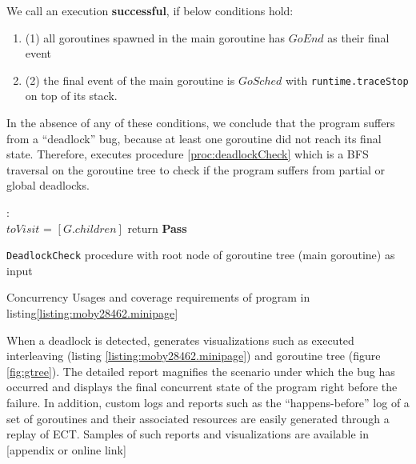 We call an execution \textbf{successful}, if below conditions hold:
\begin{enumerate}
  \item (1) all goroutines spawned in the main goroutine has $GoEnd$ as their final event
  \item (2) the final event of the main goroutine is $GoSched$ with \texttt{runtime.traceStop} on top of its stack.
\end{enumerate}

In the absence of any of these conditions, we conclude that the program suffers from a ``deadlock'' bug, because at least one goroutine did not reach its final state.
%
Therefore, \goat executes procedure \ref{proc:deadlockCheck} which is a BFS traversal on the goroutine tree to check if the program suffers from partial or global deadlocks.


\begin{small}
\begin{algorithm}[]
 \DontPrintSemicolon
 :{\\
 \Indp
    $toVisit$ = $[G.children]$\;
      return \textbf{Pass}\;
  }
 \caption{\texttt{DeadlockCheck} procedure with root node of goroutine tree (main goroutine) as input}
 \label{proc:deadlockCheck}
\end{algorithm}
\end{small}


\begin{table}[]
\centering
\caption{Concurrency Usages and coverage requirements of program in listing\ref{listing:moby28462.minipage}}
\scalebox{0.9}{

}
\label{tab:moby_cov_table}
\end{table}


When a deadlock is detected, \goat generates visualizations such as executed interleaving (listing \ref{listing:moby28462.minipage}) and goroutine tree (figure \ref{fig:gtree}).
%
The detailed report magnifies the scenario under which the bug has occurred and displays the final concurrent state of the program right before the failure.
%
In addition, custom logs and reports such as the ``happens-before'' log of a set of goroutines and their associated resources are easily generated through a replay of ECT.
%
Samples of such reports and visualizations are available in [appendix or online link]

